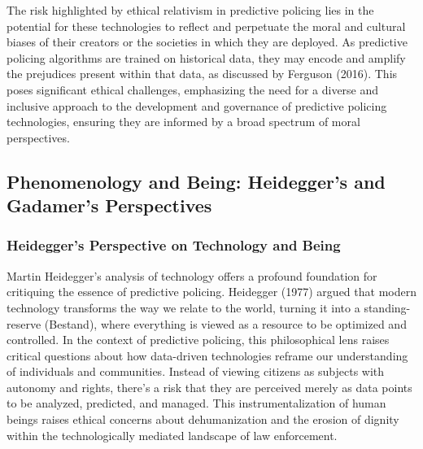 \documentclass[man, noextraspace]{apa7} %
\begin{document}
The risk highlighted by ethical relativism in predictive policing lies in the potential for these technologies to reflect and perpetuate the moral and cultural biases of their creators or the societies in which they are deployed. As predictive policing algorithms are trained on historical data, they may encode and amplify the prejudices present within that data, as discussed by Ferguson (2016). This poses significant ethical challenges, emphasizing the need for a diverse and inclusive approach to the development and governance of predictive policing technologies, ensuring they are informed by a broad spectrum of moral perspectives.

\subsection{Phenomenology and Being: Heidegger's and Gadamer's Perspectives}
\subsubsection{Heidegger's Perspective on Technology and Being
}
Martin Heidegger's analysis of technology offers a profound foundation for critiquing the essence of predictive policing. Heidegger (1977) argued that modern technology transforms the way we relate to the world, turning it into a standing-reserve (Bestand), where everything is viewed as a resource to be optimized and controlled. In the context of predictive policing, this philosophical lens raises critical questions about how data-driven technologies reframe our understanding of individuals and communities. Instead of viewing citizens as subjects with autonomy and rights, there's a risk that they are perceived merely as data points to be analyzed, predicted, and managed. This instrumentalization of human beings raises ethical concerns about dehumanization and the erosion of dignity within the technologically mediated landscape of law enforcement.
\end{document}
